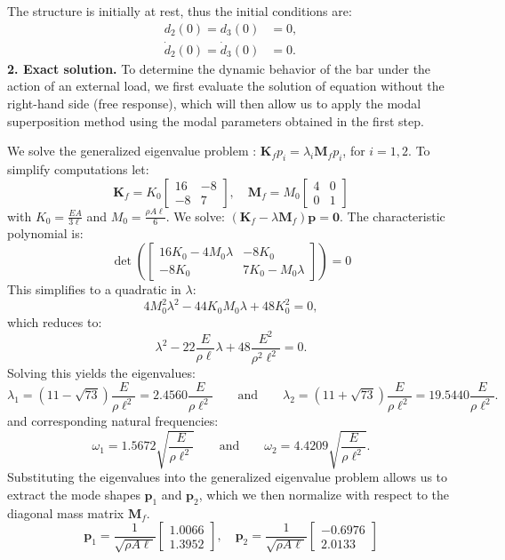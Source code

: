 \documentclass[12pt]{article}
\begin{document}
The structure is initially at rest, thus the initial conditions are:
\begin{align*}
    {d}_2(0) =  {d}_3(0)         & = 0, \\
    \dot{d}_2(0) =  \dot{d}_3(0) & = 0.
\end{align*}
\textbf{2. Exact solution.} To determine the dynamic behavior of the bar under the action of an external load, we first evaluate the solution of equation  without the right-hand side (free response), which will then allow us to apply the modal superposition method using the modal parameters obtained in the first step.

We solve the generalized eigenvalue problem : $\mathbf{K}_f p_i = \lambda_i \mathbf{M}_f p_i $, for $i=1,2$. To simplify computations let:
\[
    \mathbf{K}_f = K_0
    \begin{bmatrix}
        16 & -8 \\
        -8 & 7
    \end{bmatrix}, \quad
    \mathbf{M}_f = M_0
    \begin{bmatrix}
        4 & 0 \\
        0 & 1
    \end{bmatrix}
\]
with $K_0 = \frac{EA}{3\ell}$ and  $M_0 = \frac{\rho A \ell}{6}$. We solve: $\left( \mathbf{K}_f - \lambda \mathbf{M}_f \right) \mathbf p =\mathbf 0$. The characteristic polynomial is:
\[
    \det\left(
    \begin{bmatrix}
            16K_0 - 4M_0 \lambda & -8K_0              \\
            -8K_0                & 7K_0 - M_0 \lambda
        \end{bmatrix}
    \right) = 0
\]
This simplifies to a quadratic in \( \lambda \):
$$4M_0^2 \lambda^2 - 44K_0 M_0 \lambda + 48K_0^2 = 0,$$
which reduces to:
$$\lambda^2 - 22 \frac{E}{\rho\ell} \lambda + 48\frac{E^2}{\rho^2\ell^2} = 0.$$
Solving this yields the eigenvalues:
$$ \lambda_1=(11-\sqrt{73})\frac{E}{\rho\ell^2}=2.4560\frac{E}{\rho\ell^2} \qquad\text{and}\qquad \lambda_2=(11+\sqrt{73})\frac{E}{\rho\ell^2}=19.5440\frac{E}{\rho\ell^2}.$$
and corresponding natural frequencies:
$$ \omega_1=1.5672\sqrt{\frac{E}{\rho\ell^2}} \qquad\text{and}\qquad \omega_2=4.4209 \sqrt{\frac{E}{\rho\ell^2}}.$$
Substituting the eigenvalues into the generalized eigenvalue problem allows us to extract the mode shapes $\mathbf{p}_{1}$ and $\mathbf{p}_{2}$, which we then normalize with respect to the diagonal mass matrix $\mathbf{M}_f$.
\[
    \mathbf{p}_{1} = \frac{1}{\sqrt{\rho A \ell}}
    \begin{bmatrix}
        1.0066 \\
        1.3952
    \end{bmatrix}, \quad
    \mathbf{p}_{2} =\frac{1}{\sqrt{\rho A \ell}}
    \begin{bmatrix}
        -0.6976 \\
        2.0133
    \end{bmatrix}
\]
\end{document}
